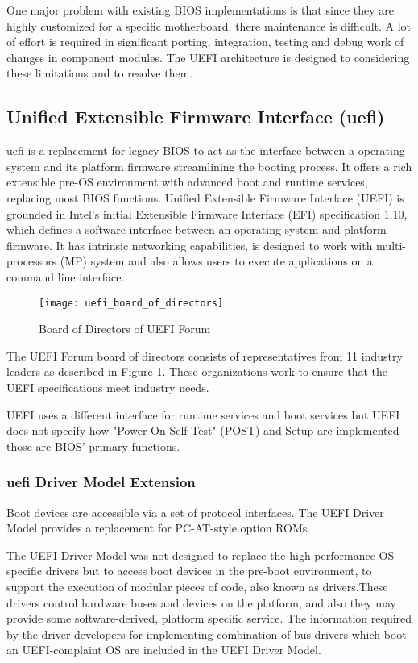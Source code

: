 One major problem with existing BIOS implementations is that since they are highly customized for a specific motherboard, there maintenance is difficult. A lot of effort is required in significant porting, integration, testing and debug work of changes in component modules. The UEFI architecture is designed to considering these limitations and to resolve them.


\subsection{Unified Extensible Firmware Interface (\gls{uefi})}
\gls{uefi} is a replacement for legacy BIOS to act as the interface between a operating system and its platform firmware streamlining the booting process. It offers a rich extensible pre-OS environment with advanced boot and runtime services, replacing most BIOS functions. Unified Extensible Firmware Interface (UEFI) is grounded in Intel’s initial Extensible Firmware Interface (EFI) specification 1.10, which defines a software interface between an operating system and platform firmware. It has intrinsic networking capabilities,  is designed to work with multi-processors (MP) system and also allows users to execute applications on a command line interface.

\begin{figure}[h]
	\centering
	\texttt{[image: uefi\_board\_of\_directors]}
	\caption{Board of Directors of UEFI Forum}\label{fig:introduction-uefi-board-of-directors}
\end{figure}

The UEFI Forum board of directors consists of representatives from 11 industry leaders as described in Figure \ref{fig:introduction-uefi-board-of-directors}. These organizations work to ensure that the UEFI specifications meet industry needs.

UEFI uses a different interface for runtime services and boot services but UEFI does not specify how "Power On Self Test" (POST) and Setup are implemented those are BIOS’ primary functions.

\subsubsection{\gls{uefi} Driver Model Extension}
Boot devices are accessible via a set of protocol interfaces. The UEFI Driver Model provides a replacement for PC-AT-style option ROMs.

The UEFI Driver Model was not designed to replace the high-performance OS specific drivers but to access boot devices in the pre-boot environment, to support the execution of modular pieces of code, also known as drivers.These drivers control hardware buses and devices on the platform, and also they may provide some software-derived, platform specific service. The information required by the driver developers for implementing combination of bus drivers which boot an UEFI-complaint OS are included in the UEFI Driver Model.

